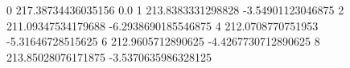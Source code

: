 0 217.38734436035156 0.0
1 213.8383331298828 -3.54901123046875
2 211.09347534179688 -6.2938690185546875
4 212.0708770751953 -5.31646728515625
6 212.9605712890625 -4.4267730712890625
8 213.85028076171875 -3.5370635986328125
